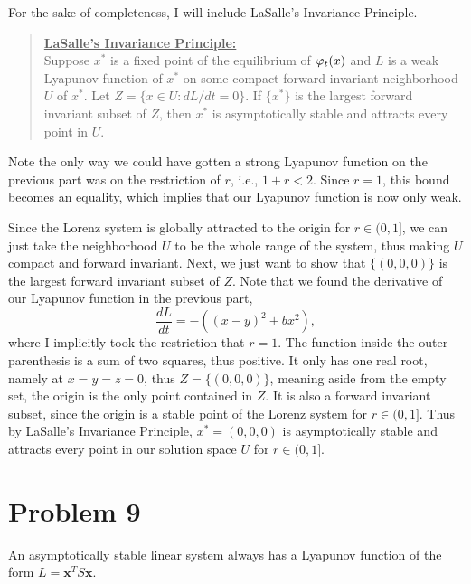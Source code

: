 \partbreak
\begin{solution}

    For the sake of completeness, I will include LaSalle's Invariance Principle.
    \begin{quote}
        \underline{\textbf{LaSalle's Invariance Principle:}} \\
        Suppose $x^*$ is a fixed point of the equilibrium of $\varphi_t(x)$ and $L$ is a weak Lyapunov function of $x^*$ on some compact forward invariant neighborhood $U$ of $x^*$. Let $Z = \{x \in U : dL/dt = 0\}$. If $\{x^*\}$ is the largest forward invariant subset of $Z$, then $x^*$ is asymptotically stable and attracts every point in $U$.
    \end{quote}

    Note the only way we could have gotten a strong Lyapunov function on the previous part was on the restriction of $r$, i.e., $1 + r < 2$. Since $r = 1$, this bound becomes an equality, which implies that our Lyapunov function is now only weak. \par

    \jump
    Since the Lorenz system is globally attracted to the origin for $r \in (0, 1]$, we can just take the neighborhood $U$ to be the whole range of the system, thus making $U$ compact and forward invariant. Next, we just want to show that $\{(0, 0, 0)\}$ is the largest forward invariant subset of $Z$. Note that we found the derivative of our Lyapunov function in the previous part, 
    \[
    \frac{dL}{dt} = -((x - y)^2 + bx^2),
    \]
    where I implicitly took the restriction that $r = 1$. The function inside the outer parenthesis is a sum of two squares, thus positive. It only has one real root, namely at $x = y = z = 0$, thus $Z = \{(0, 0, 0)\}$, meaning aside from the empty set, the origin is the only point contained in $Z$. It is also a forward invariant subset, since the origin is a stable point of the Lorenz system for $r \in (0, 1]$. Thus by LaSalle's Invariance Principle, $x^* = (0, 0, 0)$ is asymptotically stable and attracts every point in our solution space $U$ for $r \in (0, 1]$.
\end{solution}

\newpage
\section{Problem 9}
An asymptotically stable linear system always has a Lyapunov function of the form $L = \textbf{x}^TS\textbf{x}.$

